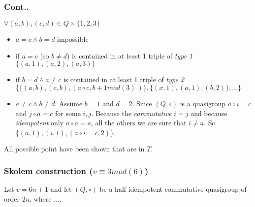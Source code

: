 \begin{frame}
\frametitle{Cont..}
$\forall (a,b),(c,d) \in Q \times \{1,2,3\}$
\begin{itemize}
	\item $a=c \wedge b=d$ impossible
	\item if $a=c$ (so $b\not = d$) is contained in at least 1 triple of \textit{type 1} $\{(a,1),(a,2),(a,3)\}$
	\item if $b=d \wedge a \not = c$ is contained in at least 1 triple of \textit{type 2} $\{\{(a,b),(c,b),(a \circ c, b+1 mod(3)\ )\}, \{(x,1),(a,1),(b,2)\}, ... \}$
	\item $a \not = c \wedge b \not = d$.%
	Assume $b=1$ and $d=2$. Since $(Q,\circ)$ is a quasigroup $a \circ i = c$ and $j \circ a = c$ for some $i,j$. Because the \textit{commutative} $i=j$ and because \textit{idempotent} only $a \circ a=a$, all the others we are sure that $i\not = a$. So $\{(a,1),(i,1),(a \circ i = c, 2)\}$.
\end{itemize}

All possible point have been shown that are in $T$.
\end{frame}

\begin{frame}
\frametitle{Skolem construction ($v \equiv 3 mod(6)$)}
Let $v = 6n +1$ and let $(Q, \circ)$ be a half-idempotent commutative quasigroup of order $2n$, where ....
\end{frame}




